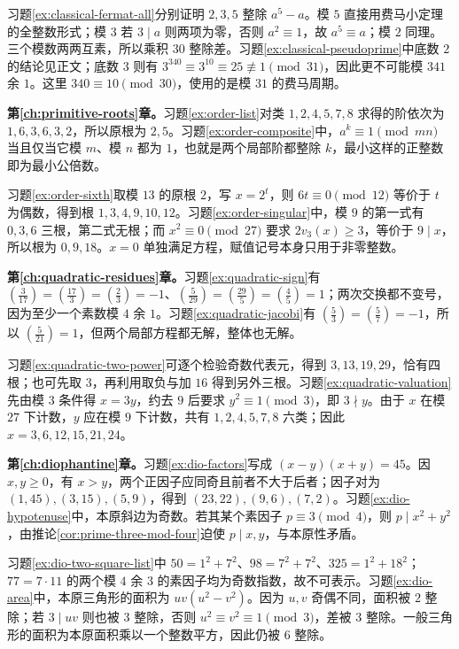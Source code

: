 \documentclass[UTF8,12pt,a4paper,fontset=fandol]{ctexbook}
\begin{document}
习题\ref{ex:classical-fermat-all}分别证明 $2,3,5$ 整除 $a^5-a$。模 $5$ 直接用费马小定理的全整数形式；模 $3$ 若 $3\mid a$ 则两项为零，否则 $a^2\equiv1$，故 $a^5\equiv a$；模 $2$ 同理。三个模数两两互素，所以乘积 $30$ 整除差。习题\ref{ex:classical-pseudoprime}中底数 $2$ 的结论见正文；底数 $3$ 则有 $3^{340}\equiv3^{10}\equiv25\not\equiv1\pmod{31}$，因此更不可能模 $341$ 余 $1$。这里 $340\equiv10\pmod{30}$，使用的是模 $31$ 的费马周期。

\textbf{第\ref{ch:primitive-roots}章。}习题\ref{ex:order-list}对类 $1,2,4,5,7,8$ 求得的阶依次为 $1,6,3,6,3,2$，所以原根为 $2,5$。习题\ref{ex:order-composite}中，$a^k\equiv1\pmod{mn}$ 当且仅当它模 $m$、模 $n$ 都为 $1$，也就是两个局部阶都整除 $k$，最小这样的正整数即为最小公倍数。

习题\ref{ex:order-sixth}取模 $13$ 的原根 $2$，写 $x=2^t$，则 $6t\equiv0\pmod{12}$ 等价于 $t$ 为偶数，得到根 $1,3,4,9,10,12$。习题\ref{ex:order-singular}中，模 $9$ 的第一式有 $0,3,6$ 三根，第二式无根；而 $x^2\equiv0\pmod{27}$ 要求 $2v_3(x)\ge3$，等价于 $9\mid x$，所以根为 $0,9,18$。$x=0$ 单独满足方程，赋值记号本身只用于非零整数。

\textbf{第\ref{ch:quadratic-residues}章。}习题\ref{ex:quadratic-sign}有 $\left(\frac3{17}\right)=\left(\frac{17}3\right)=\left(\frac23\right)=-1$、$\left(\frac5{29}\right)=\left(\frac{29}5\right)=\left(\frac45\right)=1$；两次交换都不变号，因为至少一个素数模 $4$ 余 $1$。习题\ref{ex:quadratic-jacobi}有 $\left(\frac53\right)=\left(\frac57\right)=-1$，所以 $\left(\frac5{21}\right)=1$，但两个局部方程都无解，整体也无解。

习题\ref{ex:quadratic-two-power}可逐个检验奇数代表元，得到 $3,13,19,29$，恰有四根；也可先取 $3$，再利用取负与加 $16$ 得到另外三根。习题\ref{ex:quadratic-valuation}先由模 $3$ 条件得 $x=3y$，约去 $9$ 后要求 $y^2\equiv1\pmod3$，即 $3\nmid y$。由于 $x$ 在模 $27$ 下计数，$y$ 应在模 $9$ 下计数，共有 $1,2,4,5,7,8$ 六类；因此 $x=3,6,12,15,21,24$。

\textbf{第\ref{ch:diophantine}章。}习题\ref{ex:dio-factors}写成 $(x-y)(x+y)=45$。因 $x,y\ge0$，有 $x>y$，两个正因子应同奇且前者不大于后者；因子对为 $(1,45),(3,15),(5,9)$，得到 $(23,22),(9,6),(7,2)$。习题\ref{ex:dio-hypotenuse}中，本原斜边为奇数。若其某个素因子 $p\equiv3\pmod4$，则 $p\mid x^2+y^2$，由推论\ref{cor:prime-three-mod-four}迫使 $p\mid x,y$，与本原性矛盾。

习题\ref{ex:dio-two-square-list}中 $50=1^2+7^2$、$98=7^2+7^2$、$325=1^2+18^2$；$77=7\cdot11$ 的两个模 $4$ 余 $3$ 的素因子均为奇数指数，故不可表示。习题\ref{ex:dio-area}中，本原三角形的面积为 $uv(u^2-v^2)$。因为 $u,v$ 奇偶不同，面积被 $2$ 整除；若 $3\mid uv$ 则也被 $3$ 整除，否则 $u^2\equiv v^2\equiv1\pmod3$，差被 $3$ 整除。一般三角形的面积为本原面积乘以一个整数平方，因此仍被 $6$ 整除。
\end{document}
